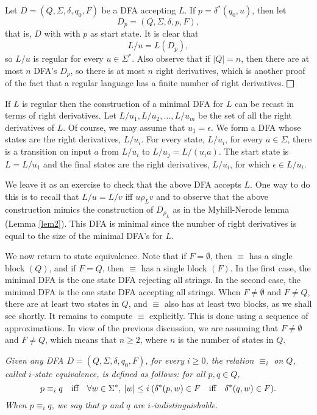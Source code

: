 \medskip
Let $D = (Q, \Sigma, \delta, q_0, F)$ be a DFA
accepting $L$. If $p = \delta^*(q_0, u)$, then let
\[
D_p = (Q, \Sigma, \delta, p, F),
\]
that is, $D$ with with $p$ as start state. It is clear that
\[
L/u = L(D_p),
\]
so $L/u$ is regular for every $u\in \Sigma^*$.
Also observe that
if $|Q| = n$, then there are at most $n$ DFA's $D_p$, so there
is at most $n$ right derivatives, which is another proof
of the fact that a regular language has a finite number of right
derivatives.
$\bigsquare$

\medskip
If $L$ is regular then
the construction of a minimal DFA for $L$
can be recast in terms of right derivatives.
Let $L/u_1, L/u_2, \ldots ,L/u_m$ be the set of all
the right derivatives of $L$. Of course, we may assume that $u_1 = \epsilon$.
We form a DFA whose states are the right derivatives, $L/u_i$.
For every state, $L/u_i$, for every $a\in \Sigma$,
there is a transition on input $a$ from 
$L/u_i$ to $L/u_j = L/(u_ia)$. The start state is $L = L/u_1$
and the final states are the right derivatives, $L/u_i$, for which 
$\epsilon \in L/u_i$.  

\medskip
We leave it as an exercise to check that the above DFA
accepts $L$. One way to do this is to recall that
$L/u = L/v$ iff $u \rho_L v$ and to observe that the above
construction mimics the construction of $D_{\rho_L}$
as in the Myhill-Nerode lemma (Lemma \ref{lem2}).
This DFA is minimal since the number of right derivatives
is equal to the size of the minimal DFA's for $L$.


\medskip
We now return to state equivalence.
Note that if $F = \emptyset$, then $\equiv$ has a single block
$(Q)$, and if $F = Q$, then $\equiv$ has a single block $(F)$.
In the first case, the minimal DFA is the one state DFA rejecting
all strings. In the second case, the minimal DFA is the one state
DFA accepting all strings. When $F\not=\emptyset$ and $F\not= Q$,
there are at least two states in $Q$, and $\equiv$ also has at least two
blocks, as we shall see shortly.
It remains to compute $\equiv$ explicitly.
This is done using a sequence of approximations.
In view of the previous discussion, we are assuming that
$F\not=\emptyset$ and $F\not= Q$, which means that $n\geq 2$, where
$n$ is the number of states in $Q$.

\begin{defin}
\label{equivSi}
{\em 
Given any DFA  $D = (Q, \Sigma, \delta, q_0, F)$, for every $i\geq 0$,
the relation $\equiv_i$ on $Q$, called {\it $i$-state equivalence\/},
is defined as follows: for all $p, q\in Q$,
$$p\equiv_i q\quad\hbox{iff}\quad
\forall w\in\Sigma^*,\> |w| \leq i\> (\delta^*(p,w)\in F\quad\hbox{iff}\quad
                           \delta^*(q,w)\in F).$$
When $p\equiv_i q$, we say that {\it $p$ and $q$ are $i$-indistinguishable\/}.
}
\end{defin}

